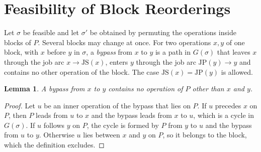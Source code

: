 \documentclass[10pt,twocolumn]{article}
\newtheorem{lemma}{Lemma}
\newcommand{\JP}{\mathrm{JP}}
\newcommand{\JS}{\mathrm{JS}}
\begin{document}
\section{Feasibility of Block Reorderings}\label{sec:feas}

Let $\sigma$ be feasible and let $\sigma'$ be obtained by permuting the
operations inside blocks of $P$. Several blocks may change at once. For
two operations $x,y$ of one block, with $x$ before $y$ in $\sigma$, a
\emph{bypass} from $x$ to $y$ is a path in $G(\sigma)$ that leaves $x$
through the job arc $x\to\JS(x)$, enters $y$ through the job arc
$\JP(y)\to y$ and contains no other operation of the block. The case
$\JS(x)=\JP(y)$ is allowed.

\begin{lemma}\label{le:clean}
A bypass from $x$ to $y$ contains no operation of $P$ other than $x$ and
$y$.
\end{lemma}
\begin{proof}
Let $u$ be an inner operation of the bypass that lies on $P$. If $u$
precedes $x$ on $P$, then $P$ leads from $u$ to $x$ and the bypass leads
from $x$ to $u$, which is a cycle in $G(\sigma)$. If $u$ follows $y$ on
$P$, the cycle is formed by $P$ from $y$ to $u$ and the bypass from $u$ to
$y$. Otherwise $u$ lies between $x$ and $y$ on $P$, so it belongs to the
block, which the definition excludes.
\end{proof}
\end{document}
